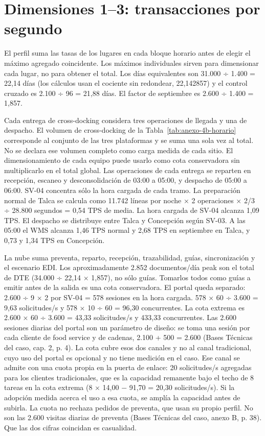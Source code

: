 \section{Dimensiones 1–3: transacciones por segundo}
\label{sec:anexo-4b-dimensiones-1-3}

El perfil suma las tasas de los lugares en cada bloque horario antes de elegir el máximo agregado coincidente. Los máximos individuales sirven para dimensionar cada lugar, no para obtener el total. Los días equivalentes son 31.000 ÷ 1.400 = 22,14 días (los cálculos usan el cociente sin redondear, 22,142857) y el control cruzado es 2.100 ÷ 96 = 21,88 días. El factor de septiembre es 2.600 ÷ 1.400 = 1,857.

Cada entrega de cross-docking considera tres operaciones de llegada y una de despacho. El volumen de cross-docking de la Tabla~\ref{tab:anexo-4b-horario} corresponde al conjunto de las tres plataformas y se suma una sola vez al total. No se declara ese volumen completo como carga medida de cada sitio. El dimensionamiento de cada equipo puede usarlo como cota conservadora sin multiplicarlo en el total global. Las operaciones de cada entrega se reparten en recepción, escaneo y desconsolidación de 03:00 a 05:00, y despacho de 05:00 a 06:00. SV-04 concentra sólo la hora cargada de cada tramo. La preparación normal de Talca se calcula como 11.742 líneas por noche × 2 operaciones × 2/3 ÷ 28.800 segundos = 0,54 TPS de media. La hora cargada de SV-04 alcanza 1,09 TPS. El despacho se distribuye entre Talca y Concepción según SV-03. A las 05:00 el WMS alcanza 1,46 TPS normal y 2,68 TPS en septiembre en Talca, y 0,73 y 1,34 TPS en Concepción.

La nube suma preventa, reparto, recepción, trazabilidad, guías, sincronización y el escenario EDI. Los aproximadamente 2.852 documentos/día peak son el total de DTE (34.000 ÷ 22,14 × 1,857), no sólo guías. Tomarlos todos como guías a emitir antes de la salida es una cota conservadora. El portal queda separado: 2.600 ÷ 9 × 2 por SV-04 = 578 sesiones en la hora cargada. 578 × 60 ÷ 3.600 = 9,63 solicitudes/s y 578 × 10 ÷ 60 = 96,30 concurrentes. La cota extrema es 2.600 × 60 ÷ 3.600 = 43,33 solicitudes/s y 433,33 concurrentes. Las 2.600 sesiones diarias del portal son un parámetro de diseño: se toma una sesión por cada cliente de food service y de cadenas, 2.100 + 500 = 2.600 (Bases Técnicas del caso, cap. 2, p. 4). La cota cubre esos dos canales y no al canal tradicional, cuyo uso del portal es opcional y no tiene medición en el caso. Ese canal se admite con una cuota propia en la puerta de enlace: 20 solicitudes/s agregadas para los clientes tradicionales, que es la capacidad remanente bajo el techo de 8 tareas en la cota extrema (8 × 14,00 − 91,70 = 20,30 solicitudes/s). Si la adopción medida acerca el uso a esa cuota, se amplía la capacidad antes de subirla. La cuota no rechaza pedidos de preventa, que usan su propio perfil. No son las 2.600 visitas diarias de preventa (Bases Técnicas del caso, anexo B, p. 38). Que las dos cifras coincidan es casualidad.

